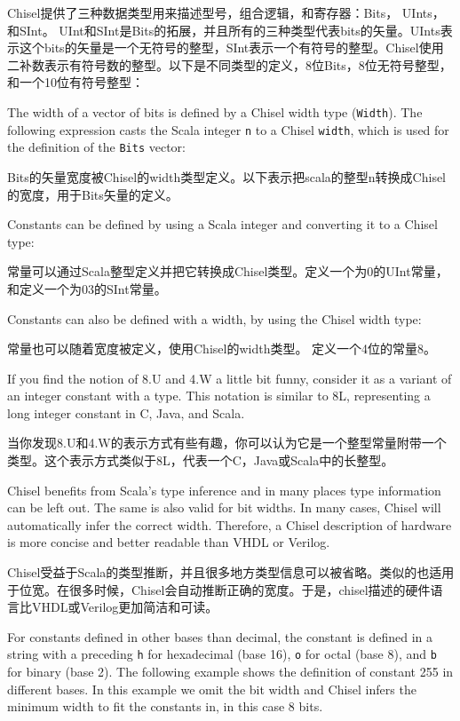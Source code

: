 \documentclass[%
    10pt,
    headinclude, footexclude,
    openright, %
    notitlepage,
    cleardoubleempty,
    headsepline,
    pointlessnumbers,
    bibtotoc, idxtotoc,
    ]{scrbook}
\newcommand{\code}[1]{{\small{\texttt{#1}}}}
\begin{document}
Chisel提供了三种数据类型用来描述型号，组合逻辑，和寄存器：Bits， UInts，和SInt。
UInt和SInt是Bits的拓展，并且所有的三种类型代表bits的矢量。UInts表示这个bits的矢量是一个无符号的整型，SInt表示一个有符号的整型。Chisel使用二补数表示有符号数的整型。以下是不同类型的定义，8位Bits，8位无符号整型，和一个10位有符号整型：



\noindent The width of a vector of bits is defined by a Chisel width type (\code{Width}).
The following expression casts the Scala integer \code{n} to a Chisel \code{width},
which is used for the definition of the \code{Bits} vector:

Bits的矢量宽度被Chisel的width类型定义。以下表示把scala的整型n转换成Chisel的宽度，用于Bits矢量的定义。


\noindent Constants can be defined by using a Scala integer and converting it to a Chisel type:

常量可以通过Scala整型定义并把它转换成Chisel类型。定义一个为0的UInt常量，和定义一个为03的SInt常量。


\noindent Constants can also be defined with a width, by using the Chisel width type:

常量也可以随着宽度被定义，使用Chisel的width类型。 定义一个4位的常量8。


\noindent If you find the notion of 8.U and 4.W a little bit funny, consider it as a variant of an integer
constant with a type. This notation is similar to 8L, representing a long integer constant in C, Java, and Scala.

当你发现8.U和4.W的表示方式有些有趣，你可以认为它是一个整型常量附带一个类型。这个表示方式类似于8L，代表一个C，Java或Scala中的长整型。

Chisel benefits from Scala's type inference and in many places type information can be left out.
The same is also valid for bit widths. In many cases, Chisel will automatically infer the correct width.
Therefore, a Chisel description of hardware is more concise and better readable than VHDL or
Verilog.

Chisel受益于Scala的类型推断，并且很多地方类型信息可以被省略。类似的也适用于位宽。在很多时候，Chisel会自动推断正确的宽度。于是，chisel描述的硬件语言比VHDL或Verilog更加简洁和可读。

For constants defined in other bases than decimal, the constant is defined in a string with
a preceding \code{h} for hexadecimal (base 16), \code{o} for octal (base 8), and \code{b}
for binary (base 2). The following example shows the definition of constant 255 in different
bases. In this example we omit the bit width and Chisel infers the minimum width to fit
the constants in, in this case 8 bits.
\end{document}
